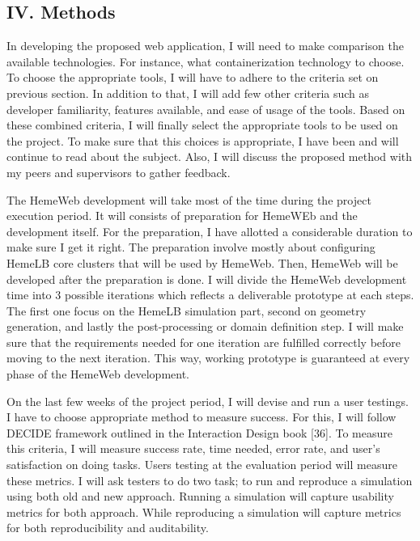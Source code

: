 \documentclass[]{article}
\begin{document}
\subsection{IV. Methods}\label{iv.-methods}

In developing the proposed web application, I will need to make
comparison the available technologies. For instance, what
containerization technology to choose. To choose the appropriate tools,
I will have to adhere to the criteria set on previous section. In
addition to that, I will add few other criteria such as developer
familiarity, features available, and ease of usage of the tools. Based
on these combined criteria, I will finally select the appropriate tools
to be used on the project. To make sure that this choices is
appropriate, I have been and will continue to read about the subject.
Also, I will discuss the proposed method with my peers and supervisors
to gather feedback.

The HemeWeb development will take most of the time during the project
execution period. It will consists of preparation for HemeWEb and the
development itself. For the preparation, I have allotted a considerable
duration to make sure I get it right. The preparation involve mostly
about configuring HemeLB core clusters that will be used by HemeWeb.
Then, HemeWeb will be developed after the preparation is done. I will
divide the HemeWeb development time into 3 possible iterations which
reflects a deliverable prototype at each steps. The first one focus on
the HemeLB simulation part, second on geometry generation, and lastly
the post-processing or domain definition step. I will make sure that the
requirements needed for one iteration are fulfilled correctly before
moving to the next iteration. This way, working prototype is guaranteed
at every phase of the HemeWeb development.

On the last few weeks of the project period, I will devise and run a
user testings. I have to choose appropriate method to measure success.
For this, I will follow DECIDE framework outlined in the Interaction
Design book {[}36{]}. To measure this criteria, I will measure success
rate, time needed, error rate, and user's satisfaction on doing tasks.
Users testing at the evaluation period will measure these metrics. I
will ask testers to do two task; to run and reproduce a simulation using
both old and new approach. Running a simulation will capture usability
metrics for both approach. While reproducing a simulation will capture
metrics for both reproducibility and auditability.
\end{document}
